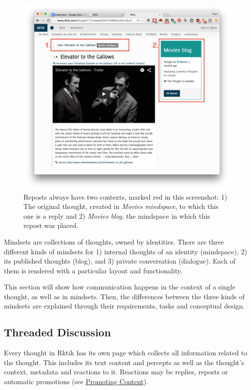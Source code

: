 \begin{figure}[htbp]
\centering
\includegraphics{img/context.png}
\caption{Reposts always have two contexts, marked red in this
screenshot: 1) The original thought, created in \emph{Movies mindspace},
to which this one is a reply and 2) \emph{Movies blog}, the mindspace in
which this repost was placed.}
\end{figure}

Mindsets are collections of thoughts, owned by identities. There are
three different kinds of mindsets for 1) internal thoughts of an
identity (mindspace), 2) its published thoughts (blog), and 3) private
conversation (dialogue). Each of them is rendered with a particular
layout and functionality.

This section will show how communication happens in the context of a
single thought, as well as in mindsets. Then, the differences between
the three kinds of mindsets are explained through their requirements,
tasks and conceptual design.

\subsection{Threaded Discussion}\label{threaded-discussion}

Every thought in Rktik has its own page which collects all information
related to the thought. This includes its text content and percepts as
well as the thought's context, metadata and reactions to it. Reactions
may be replies, reposts or automatic promotions (see
\hyperref[promoting-content]{Promoting Content}).

